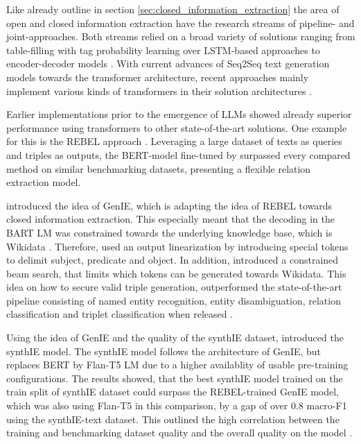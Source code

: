 \documentclass[a4paper,oneside,bibliography=totoc]{scrbook}
\begin{document}
Like already outline in section \ref{sec:closed_information_extraction} the area of open and closed information extraction have the research streams of pipeline- and joint-approaches. Both streams relied on a broad variety of solutions ranging from table-filling with tag probability learning over LSTM-based approaches to encoder-decoder models \cite{Zhang2022,Angeli2015,Trisedya2019}. With current advances of Seq2Seq text generation models towards the transformer architecture, recent approaches mainly implement various kinds of transformers in their solution architectures \cite{Josifoski2021,Josifoski2023,Moeller2024}.

Earlier implementations prior to the emergence of \acp{LLM} showed already superior performance using transformers to other state-of-the-art solutions. One example for this is the REBEL approach \cite{HuguetCabot2021}. Leveraging a large dataset of texts as queries and triples as outputs, the BERT-model fine-tuned by \citet{HuguetCabot2021} surpassed every compared method on similar benchmarking datasets, presenting a flexible relation extraction model.

\citet{Josifoski2021} introduced the idea of GenIE, which is adapting the idea of REBEL towards closed information extraction. This especially meant that the decoding in the BART \ac{LM} was constrained towards the underlying knowledge base, which is Wikidata \cite{Josifoski2021}. Therefore, \citet{Josifoski2021} used an output linearization by introducing special tokens to delimit subject, predicate and object. In addition, \cite{Josifoski2021} introduced a constrained beam search, that limits which tokens can be generated towards Wikidata. This idea on how to secure valid triple generation, outperformed the state-of-the-art pipeline consisting of named entity recognition, entity disambiguation, relation classification and triplet classification when released \cite{Josifoski2021}.

Using the idea of GenIE and the quality of the synthIE dataset, \citet{Josifoski2023} introduced the synthIE model. The synthIE model follows the architecture of GenIE, but replaces BERT by Flan-T5 \ac{LM} due to a higher availablity of usable pre-training configurations. The results showed, that the best synthIE model trained on the train split of synthIE dataset could surpass the REBEL-trained GenIE model, which was also using Flan-T5 in this comparison, by a gap of over 0.8 macro-F1 using the synthIE-text dataset. This outlined the high correlation between the training and benchmarking dataset quality and the overall quality on the model \cite{Josifoski2023}.
\end{document}
